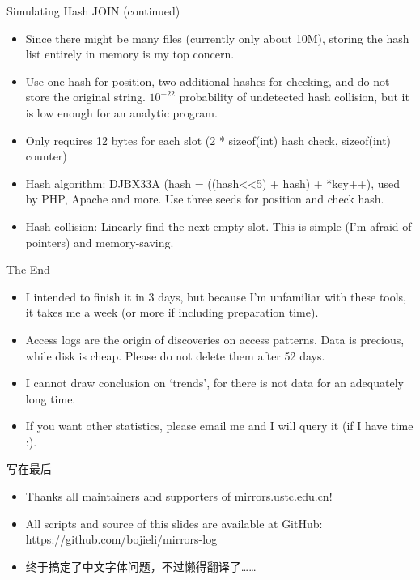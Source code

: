 \documentclass{beamer}
\begin{document}
\begin{frame}{Simulating Hash JOIN (continued)}
\begin{itemize}
  \item Since there might be many files (currently only about 10M), storing the hash list entirely in memory is my top concern.
  \item Use one hash for position, two additional hashes for checking, and do not store the original string. $10^{-22}$ probability of undetected hash collision, but it is low enough for an analytic program.
  \item Only requires 12 bytes for each slot (2 * sizeof(int) hash check, sizeof(int) counter)
  \item Hash algorithm: DJBX33A (hash = ((hash<<5) + hash) + *key++), used by PHP, Apache and more. Use three seeds for position and check hash.
  \item Hash collision: Linearly find the next empty slot. This is simple (I'm afraid of pointers) and memory-saving.
\end{itemize}
\end{frame}

\begin{frame}{The End}
\begin{itemize}
  \item I intended to finish it in 3 days, but because I'm unfamiliar with these tools, it takes me a week (or more if including preparation time).
  \item Access logs are the origin of discoveries on access patterns. Data is precious, while disk is cheap. Please do not delete them after 52 days.
  \item I cannot draw conclusion on `trends', for there is not data for an adequately long time.
  \item If you want other statistics, please email me and I will query it (if I have time :).
\end{itemize}
\end{frame}

\begin{frame}{写在最后}
\begin{itemize}
  \item Thanks all maintainers and supporters of mirrors.ustc.edu.cn!
  \item All scripts and source of this slides are available at GitHub: https://github.com/bojieli/mirrors-log
  \item 终于搞定了中文字体问题，不过懒得翻译了……
\end{itemize}
\end{frame}
\end{document}

